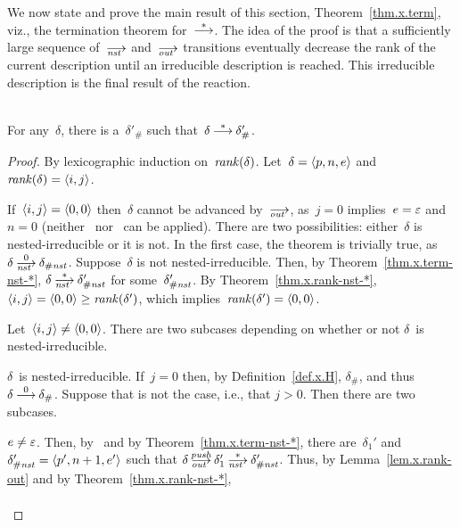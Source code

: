 We now state and prove the main result of this section,
Theorem~\ref{thm.x.term}, viz., the termination theorem for~$\trans[*]$.
The idea of the proof is that a sufficiently large sequence of~$\nst$
and~$\out$ transitions eventually decrease the rank of the current
description until an irreducible description is reached.  This irreducible
description is the final result of the reaction.
\begin{theorem}[Termination]\label{thm.x.term}\strut\\
  For any~$\delta$, there is a~$\delta'_\#$ such
  that~$\delta\trans[*]\delta'_\#$.
\end{theorem}
\begin{proof}
  By lexicographic induction on~$\operatorname{\mathit{rank}}(\delta)$.  Let~$\delta=\<p,n,e>$ and
  $\rank(\delta)=\<i,j>$.
  \begin{basis}
    If~$\<i,j>=\<0,0>$ then~$\delta$ cannot be advanced by~$\out$, as~$j=0$
    implies~$e=\varepsilon$ and~$n=0$ (neither~ nor~ can be
    applied).  There are two possibilities:  either~$\delta$ is
    nested-irreducible or it is not.  In the first case, the theorem is
    trivially true, as~$\delta\nst[0]\delta_\Hnst$.  Suppose~$\delta$ is not
    nested-irreducible.  Then, by Theorem~\ref{thm.x.term-nst-*},
    $\delta\nst[*]\delta'_\Hnst$ for some~$\delta'_{\#\mathit{nst}}$.  By
    Theorem~\ref{thm.x.rank-nst-*},
    $\<i,j>=\<0,0>\ge\rank(\delta')$,
    which implies~$\rank(\delta')=\<0,0>$.
  \end{basis}
  \begin{induction}
    Let~$\<i,j>\ne\<0,0>$.
    There are two subcases depending on whether or not $\delta$~is
    nested-irreducible.
    \begin{case}
      \label{thm.x.term.Hnst}
      $\delta$~is nested-irreducible.
      If~$j=0$ then, by Definition~\ref{def.x.H}, $\delta_\#$, and
      thus~$\delta\trans[0]\delta_\#$.  Suppose that is not the case, i.e.,
      that $j>0$.  Then there are two subcases.
      \begin{subcase}
        \label{thm.x.term.Hnst-j>0-nonnil}
        $e\ne\varepsilon$.
        Then, by~ and by Theorem~\ref{thm.x.term-nst-*}, there
        are~$\delta_1'$ and~$\delta'_\Hnst=\<p',n+1,e'>$ such that
        $\delta\outpush\delta_1'\nst[*]\delta'_\Hnst$.  Thus, by
        Lemma~\ref{lem.x.rank-out} and by Theorem~\ref{thm.x.rank-nst-*},
        \begin{align*}

\end{align*}
\end{subcase}
\end{case}
\end{induction}
\end{proof}
